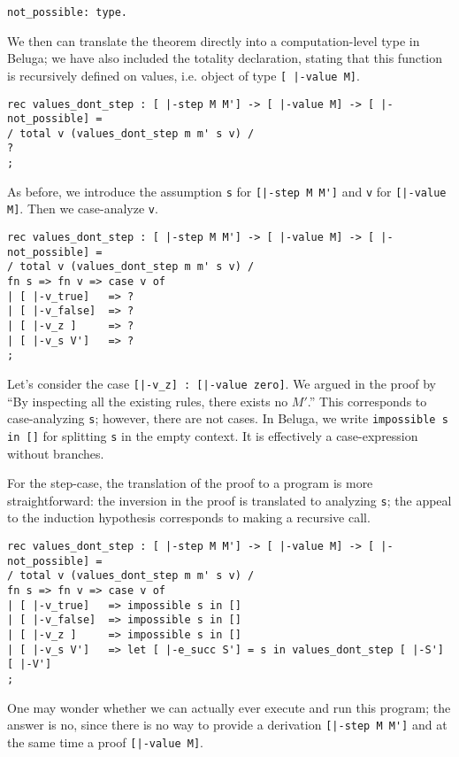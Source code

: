 \begin{lstlisting}
not_possible: type.
\end{lstlisting}

We then can translate the theorem directly into a computation-level type in
Beluga; we have also included the totality declaration, stating that this
function is recursively defined on values, i.e. object of type \lstinline![ |-value M]!.

\begin{lstlisting}
rec values_dont_step : [ |-step M M'] -> [ |-value M] -> [ |-not_possible] = 
/ total v (values_dont_step m m' s v) /
?
;
\end{lstlisting}

As before, we introduce the assumption \lstinline!s! for 
\lstinline![|-step M M']! and \lstinline!v! for 
\lstinline![|-value M]!. Then we case-analyze \lstinline!v!. 

\begin{lstlisting}
rec values_dont_step : [ |-step M M'] -> [ |-value M] -> [ |-not_possible] = 
/ total v (values_dont_step m m' s v) /
fn s => fn v => case v of 
| [ |-v_true]   => ?
| [ |-v_false]  => ?
| [ |-v_z ]     => ?
| [ |-v_s V']   => ?
;
\end{lstlisting}

Let's consider the case \lstinline![|-v_z] : [|-value zero]!. We argued in the
proof by ``By inspecting all the existing rules, there exists no $M'$.'' This
corresponds to case-analyzing \lstinline!s!; however, there are not cases. In
Beluga, we write \lstinline!impossible s in []! for splitting \lstinline!s! in
the empty context. It is effectively a case-expression without branches.

For the step-case, the translation of the proof to a program is more
straightforward: the inversion in the proof is translated to analyzing
\lstinline!s!; the appeal to the induction hypothesis corresponds to making a
recursive call.

\begin{lstlisting}
rec values_dont_step : [ |-step M M'] -> [ |-value M] -> [ |-not_possible] = 
/ total v (values_dont_step m m' s v) /
fn s => fn v => case v of 
| [ |-v_true]   => impossible s in []
| [ |-v_false]  => impossible s in []
| [ |-v_z ]     => impossible s in []
| [ |-v_s V']   => let [ |-e_succ S'] = s in values_dont_step [ |-S'] [ |-V']
;
\end{lstlisting}

One may wonder whether we can actually ever execute and run this program; the
answer is no, since there is no way to provide a derivation 
\lstinline![|-step M M']! and at the same time a proof \lstinline![|-value M]!.


